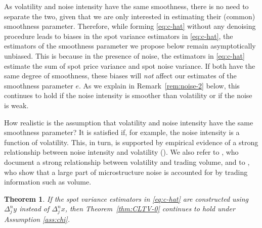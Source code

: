 \documentclass[ecta,nameyear,draft]{econsocart}
\newtheorem{theorem}{Theorem}[section]
\newcommand{\1}{\mathbf 1}
\numberwithin{equation}{section}
\begin{document}
As   volatility and noise intensity have the same smoothness, there is no need to separate   the two, given that we are only interested in estimating their (common) smoothness parameter. Therefore, while forming \eqref{eq:c-hat} without any denoising procedure   leads to biases in the spot variance estimators in \eqref{eq:c-hat},  the estimators of the smoothness parameter we propose below remain asymptotically unbiased. This is because in the presence of noise, the estimators in \eqref{eq:c-hat} estimate the sum of spot price variance and spot noise variance. If both have the same degree of smoothness, 
these biases will \emph{not} affect our estimates of the smoothness parameter $e$. As we explain in Remark~\ref{rem:noise-2} below, this continues to hold if the noise intensity is smoother than volatility or if the noise is weak.

How realistic is the assumption that volatility and noise intensity have the same smoothness parameter? It is satisfied if, for example, the noise intensity is a function of volatility. This, in turn, is supported by empirical evidence of a strong relationship between noise intensity and volatility (\cite{AY09}). We also refer to \cite{BLX18}, who document a strong relationship between volatility and trading volume, and to \cite{LXZ16}, who show that a large part of microstructure noise is accounted for by trading information such as volume.

\begin{theorem}
	\label{thm:CLTV} If the spot variance estimators in \eqref{eq:c-hat} are constructed using $\Delta^n_j y$ instead of $\Delta^n_j x$, then
	Theorem~\ref{thm:CLTV-0} continues to hold
	under Assumption  \ref{ass:chi}.
\end{theorem}

\end{document}
